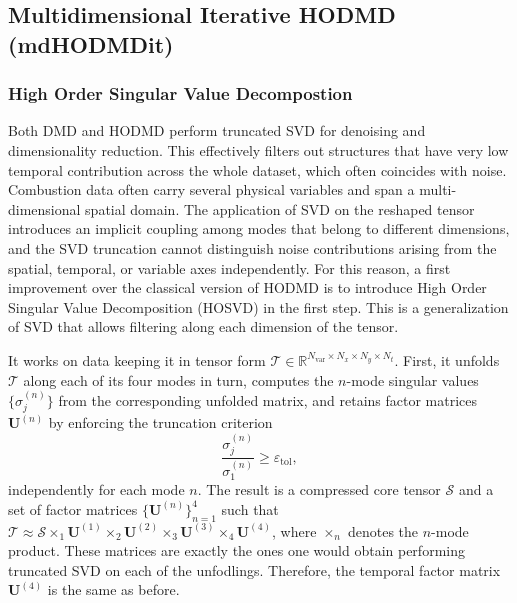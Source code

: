 \subsection{Multidimensional Iterative HODMD (mdHODMDit)}
\label{sec:method_mdhodmd}

\subsubsection{High Order Singular Value Decompostion}

Both DMD and HODMD perform truncated SVD for denoising and dimensionality reduction. This effectively filters out structures that have very low temporal contribution across the whole dataset, which often coincides with noise. Combustion data often carry several physical variables and span a multi-dimensional spatial domain. The application of SVD on the reshaped tensor introduces an implicit coupling among modes that belong to different dimensions, and the SVD truncation cannot distinguish noise contributions arising from the spatial, temporal, or variable axes independently. 
For this reason, a first improvement over the classical version of HODMD is to introduce High Order Singular Value Decomposition (HOSVD) \cite{de2000multilinear} in the first step. This is a generalization of SVD that allows filtering along each dimension of the tensor. 

It works on data keeping it in tensor form $\mathcal{T} \in \mathbb{R}^{N_{\mathrm{var}} \times N_x \times N_y \times N_t}$.
First, it unfolds $\mathcal{T}$ along each of its four modes in turn, computes the
$n$-mode singular values $\{\sigma_j^{(n)}\}$ from the corresponding unfolded matrix, and
retains factor matrices $\mathbf{U}^{(n)}$ by enforcing the truncation criterion
\begin{equation}
    \frac{\sigma_j^{(n)}}{\sigma_1^{(n)}} \geq \varepsilon_{\mathrm{tol}},
    \label{eq:hosvd_trunc}
\end{equation}
independently for each mode $n$.
The result is a compressed core tensor $\mathcal{S}$ and a set of factor matrices
$\{\mathbf{U}^{(n)}\}_{n=1}^{4}$ such that
$\mathcal{T} \approx \mathcal{S} \times_1 \mathbf{U}^{(1)} \times_2 \mathbf{U}^{(2)}
\times_3 \mathbf{U}^{(3)} \times_4 \mathbf{U}^{(4)}$,
where $\times_n$ denotes the $n$-mode product. These matrices are exactly the ones one would obtain performing truncated SVD on each of the unfodlings.
Therefore, the temporal factor matrix $\mathbf{U}^{(4)}$ is the same as before.

